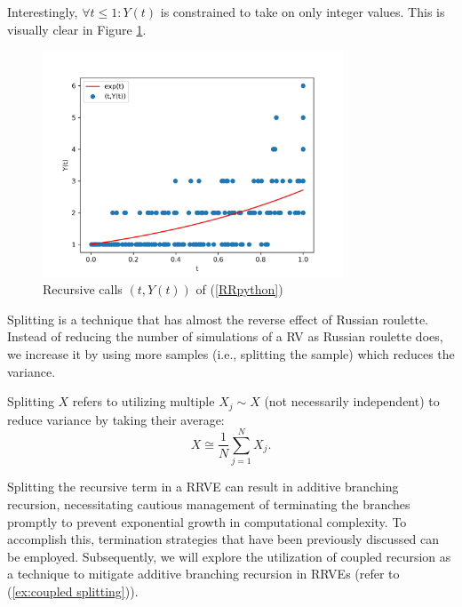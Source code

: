 \documentclass[a4paper,12pt]{article}
\begin{document}
\vspace{0.2cm}

\begin{pythonn} \label{RRpython}
    Interestingly, $\forall t \le 1:Y(t)$ is constrained to take on only integer values.
    This is visually clear in Figure \ref{fig:russian roulette}.
    \begin{figure}[h!]
        \centering
        \includegraphics[width=0.8\textwidth]{plots/russian roulette example.png}
        \caption{Recursive calls $(t,Y(t))$ of (\ref{RRpython}) }
        \label{fig:russian roulette}
    \end{figure}

\end{pythonn}

Splitting is a technique that has almost the reverse effect of Russian roulette.
Instead of reducing the number of simulations of a RV as Russian roulette does,
we increase it by using more samples (i.e., splitting the sample) which
reduces the variance.

\begin{definition}[splitting] \label{def:splitting}
    Splitting $X$ refers to utilizing multiple $X_{j} \sim X$ (not necessarily independent) to
    reduce variance by taking their average:
    \begin{equation}
        X \cong \frac{1}{N} \sum_{j=1}^{N} X_{j}.
    \end{equation}
\end{definition}

Splitting the recursive term in a RRVE can result in additive branching recursion,
necessitating cautious management of terminating the branches promptly to prevent
exponential growth in computational complexity. To accomplish this, termination
strategies that have been previously discussed can be employed. Subsequently,
we will explore the utilization of coupled recursion as a technique to mitigate
additive branching recursion in RRVEs (refer to (\ref{ex:coupled splitting})).
\end{document}
